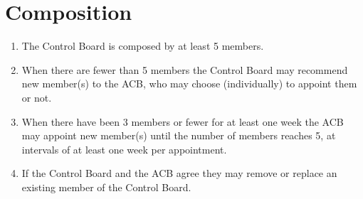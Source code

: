 \documentclass[]{article}
\begin{document}
\section{Composition}
\label{sec:composition}

\begin{enumerate}
\item The Control Board is composed by at least 5 members.

\item When there are fewer than 5 members the Control Board may recommend new member(s) to the ACB, who may choose (individually) to appoint them or not.

\item When there have been 3 members or fewer for at least one week the ACB may appoint new member(s) until the number of members reaches 5, at intervals of at least one week per appointment.

\item If the Control Board and the ACB agree they may remove or replace an existing member of the Control Board.

\end{enumerate}
\end{document}
